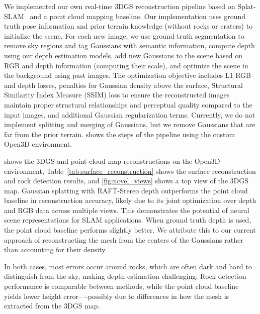 We implemented our own real-time 3DGS reconstruction pipeline based on Splat-SLAM~\cite{sandstrom_splat-slam_2024} and a point cloud mapping baseline. Our implementation uses ground truth pose information and prior terrain knowledge (without rocks or craters) to initialize the scene. For each new image, we use ground truth segmentation to remove sky regions and tag Gaussians with semantic information, compute depth using our depth estimation models, add new Gaussians to the scene based on RGB and depth information (computing their scale), and optimize the scene in the background using past images. The optimization objective includes L1 RGB and depth losses, penalties for Gaussian density above the surface, Structural Similarity Index Measure (SSIM) loss to ensure the reconstructed images maintain proper structural relationships and perceptual quality compared to the input images, and additional Gaussian regularization terms.
Currently, we do not implement splitting and merging of Gaussians, but we remove Gaussians that are far from the prior terrain.
 shows the steps of the pipeline using the custom Open3D environment.

 shows the 3DGS and point cloud map reconstructions on the Open3D environment, Table~\ref{tab:surface_reconstruction} shows the surface reconstruction and rock detection results, and \cref{fig:novel_views} shows a top view of the 3DGS map. Gaussian splatting with RAFT-Stereo depth outperforms the point cloud baseline in reconstruction accuracy, likely due to its joint optimization over depth and RGB data across multiple views. This demonstrates the potential of neural scene representations for SLAM applications. When ground truth depth is used, the point cloud baseline performs slightly better. We attribute this to our current approach of reconstructing the mesh from the centers of the Gaussians rather than accounting for their density.

In both cases, most errors occur around rocks, which are often dark and hard to distinguish from the sky, making depth estimation challenging. Rock detection performance is comparable between methods, while the point cloud baseline yields lower height error—-possibly due to differences in how the mesh is extracted from the 3DGS map.

